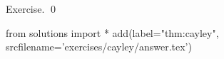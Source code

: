
\begin{thm}
  \label{thm:cayley}
  
\end{thm}
\proof
Exercise.
\qed
\begin{python0}
from solutions import *
add(label="thm:cayley",
    srcfilename='exercises/cayley/answer.tex') 
\end{python0}
